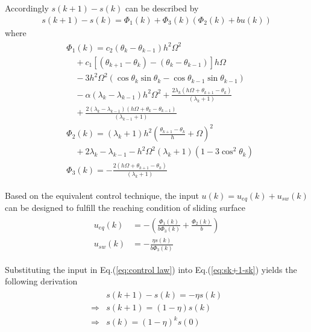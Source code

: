 \documentclass[10pt,final,journal]{IEEEtran}
\begin{document}
	Accordingly $s(k+1)-s(k)$ can be described by 
	\begin{align} \label{eq:sk+1-sk}
		s(k+1)-s(k)=\Phi_1(k)+\Phi_3(k)(\Phi_2(k)+bu(k))
	\end{align}
	where 
	\begin{align}\begin{split}
		&\Phi_1(k)
				=c_2(\theta_k-\theta_{k-1})h^2\Omega^2\\
				&\quad+c_1[(\theta_{k+1}-\theta_k)-(\theta_{k}-\theta_{k-1})]h\Omega\\
                &\quad-3h^2\Omega^2(\cos\theta_k\sin\theta_k-\cos\theta_{k-1}\sin\theta_{k-1})\\
				&\quad-\alpha(\lambda_k-\lambda_{k-1})h^2\Omega^2+\frac{2\lambda_k(h\Omega+\theta_{k+1}-\theta_{k})}{(\lambda_{k}+1)}\\
				&\quad+\frac{2(\lambda_k-\lambda_{k-1})(h\Omega+\theta_k-\theta_{k-1})}{(\lambda_{k-1}+1)}\\
				&\Phi_2(k)=(\lambda_k+1)h^2\left(\frac{\theta_{k+1}-\theta_{k}}{h}+\Omega\right)^2\\
				&\quad+2\lambda_k-\lambda_{k-1}-h^2\Omega^2(\lambda_k+1)(1-3\cos^2\theta_{k})\\
				&\Phi_3(k)=-\frac{2(h\Omega+\theta_{k+1}-\theta_{k})}{(\lambda_{k}+1)}
	\end{split}\end{align}

	Based on the equivalent control technique, the input $u(k)=u_{eq}(k)+u_{sw}(k)$ can be designed to fulfill the reaching condition of sliding surface
	\begin{align}\begin{split}\label{eq:control law}
		u_{eq}(k) &= -\left(\frac{\Phi_1(k)}{b\Phi_3(k)}+\frac{\Phi_2(k)}{b}\right)\\
		u_{sw}(k) &= -\frac{\eta s(k)}{b\Phi_3(k)}
	\end{split}\end{align}
	
	Substituting the input in Eq.(\ref{eq:control law}) into Eq.(\ref{eq:sk+1-sk}) yields the following derivation 
	\begin{align}\begin{split}\label{eq:s(k+1)-s(k) s}
		&s(k+1)-s(k) = -\eta s(k)\\
		\Rightarrow &s(k+1)=(1-\eta)s(k)\\
		\Rightarrow &s(k)=(1-\eta)^ks(0)
	\end{split}\end{align}
\end{document}

